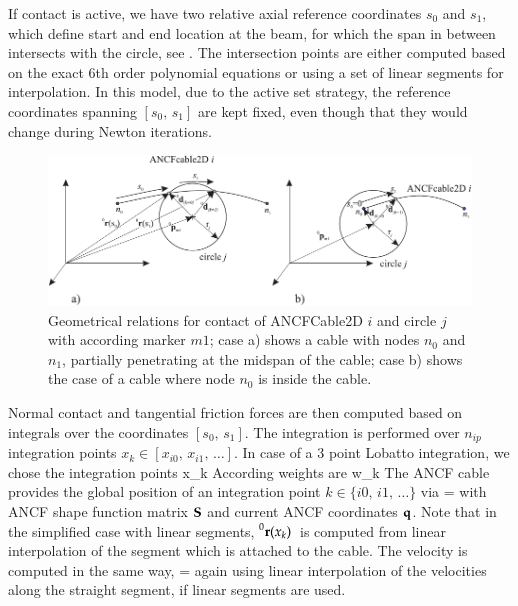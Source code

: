 %
\noindent If contact is active, we have two relative axial reference coordinates $s_0$ and $s_1$, which define start and end location at the beam, for which the span in between intersects with the circle, see .
The intersection points are either computed based on the exact 6th order polynomial equations or using a set of linear segments for interpolation.
In this model, due to the active set strategy, the reference coordinates spanning $[s_0,\, s_1]$ are kept fixed, even though that they would change during Newton iterations.
\begin{figure}[tbph]
  \begin{center}
  \includegraphics[width=\textwidth]{figures/generalContactANCF2Dcircle}
  \end{center}
  \caption{Geometrical relations for contact of ANCFCable2D $i$ and circle $j$ with according marker $m1$; case a) shows a cable with nodes $n_0$ and $n_1$, partially penetrating at the midspan of the cable; case b) shows the case of a cable where node $n_0$ is inside the cable.}
  \label{fig_generalContactANCF2Dcircle}
\end{figure}

Normal contact and tangential friction forces are then computed based on integrals over the coordinates $[s_0,\, s_1]$.
The integration is performed over $n_{ip}$ integration points $x_k \in [x_{i0},\, x_{i1},\, \ldots]$. In case of a 3 point Lobatto integration, we chose the integration points 
\be
  x_k \in [s_0, (s_0+s_1)/2, s_1] \eqDot
\ee
According weights are
\be
  w_k \in [1/3, 4/3, 1/3] \eqDot
\ee
The ANCF cable provides the global position of an integration point $k \in \{i0,\, i1,\, \ldots\}$ via
\be
   =  \qv
\ee
with ANCF shape function matrix $\mathbf{S}$ and current ANCF coordinates $\mathbf{q}$.
Note that in the simplified case with linear segments, $\prescript{0}{}{\mathbf{r}(x_{k})}\,$ is computed from linear interpolation of the segment which is attached to the cable.
The velocity is computed in the same way,
\be
   =  \dot\qv
\ee
again using linear interpolation of the velocities along the straight segment, if linear segments are used.

